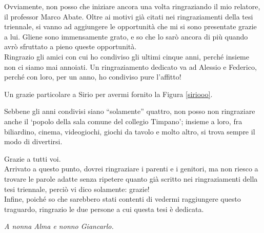 Ovviamente, non posso che iniziare ancora una volta ringraziando il mio relatore, il professor Marco Abate. Oltre ai motivi già citati nei ringraziamenti della tesi triennale, si vanno ad aggiungere le opportunità che mi si sono presentate grazie a lui. Gliene sono immensamente grato, e so che lo sarò ancora di più quando avrò sfruttato a pieno queste opportunità.\\

Ringrazio gli amici con cui ho condiviso gli ultimi cinque anni, perché insieme non ci siamo mai annoiati. Un ringraziamento dedicato va ad Alessio e Federico, perché con loro, per un anno, ho condiviso pure l'affitto!

Un grazie particolare a Sirio per avermi fornito la Figura \ref{siriooo}.

Sebbene gli anni condivisi siano ``solamente'' quattro, non posso non ringraziare anche il `popolo della sala comune del collegio Timpano'; insieme a loro, fra biliardino, cinema, videogiochi, giochi da tavolo e molto altro, si trova sempre il modo di divertirsi.

Grazie a tutti voi.\\

Arrivato a questo punto, dovrei ringraziare i parenti e i genitori, ma non riesco a trovare le parole adatte senza ripetere quanto già scritto nei ringraziamenti della tesi triennale, perciò vi dico solamente: grazie!\\

Infine, poiché so che sarebbero stati contenti di vedermi raggiungere questo traguardo, ringrazio le due persone a cui questa tesi è dedicata.

\textit{A nonna Alma e nonno Giancarlo.}